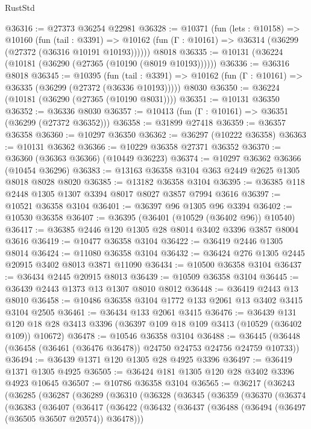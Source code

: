 \begin{lexlean}{RustStd}
\begin{coremodule}
@36316 := @27373 @36254 @22981
@36328 := @10371
    (fun (lets : @10158) =>
    @10160
      (fun (tail : @3391) =>
      @10162 (fun (Γ : @10161) => @36314 (@36299 (@27372 (@36316 @10191 @10193))))))
    @8018
@36335 := @10131 (@36224 (@10181 (@36290 (@27365 (@10190 (@8019 @10193))))))
@36336 := @36316 @8018
@36345 := @10395
    (fun (tail : @3391) => @10162 (fun (Γ : @10161) => @36335 (@36299 (@27372 (@36336 @10193)))))
    @8030
@36350 := @36224 (@10181 (@36290 (@27365 (@10190 @8031))))
@36351 := @10131 @36350
@36352 := @36336 @8030
@36357 := @10413 (fun (Γ : @10161) => @36351 (@36299 (@27372 @36352)))
@36358 := @31899 @27418
@36359 := @36357 @36358
@36360 := @10297 @36350
@36362 := @36297 (@10222 @36358)
@36363 := @10131 @36362
@36366 := @10229 @36358 @27371 @36352
@36370 := @36360 (@36363 @36366) (@10449 @36223)
@36374 := @10297 @36362 @36366 (@10454 @36296)
@36383 := @13163 @36358 @3104 @363 @2449 @2625 @1305 @8018 @8028 @8020
@36385 := @13182 @36358 @3104
@36395 := @36385 @118 @2448 @1305 @1307 @3394 @8017 @8027 @3857 @7994 @3616
@36397 := @10521 @36358 @3104
@36401 := @36397 @96 @1305 @96 @3394
@36402 := @10530 @36358
@36407 := @36395 (@36401 (@10529 (@36402 @96)) @10540)
@36417 := @36385 @2446 @120 @1305 @28 @8014 @3402 @3396 @3857 @8004 @3616
@36419 := @10477 @36358 @3104
@36422 := @36419 @2446 @1305 @8014
@36424 := @11080 @36358 @3104
@36432 := @36424 @276 @1305 @2445 @20915 @3402 @8013 @3871 @11090
@36434 := @10500 @36358 @3104
@36437 := @36434 @2445 @20915 @8013
@36439 := @10509 @36358 @3104
@36445 := @36439 @2443 @1373 @13 @1307 @8010 @8012
@36448 := @36419 @2443 @13 @8010
@36458 := @10486 @36358 @3104 @1772 @133 @2061 @13 @3402 @3415 @3104 @2505
@36461 := @36434 @133 @2061 @3415
@36476 := @36439
    @131
    @120
    @18
    @28
    @3413
    @3396
    (@36397 @109 @18 @109 @3413 (@10529 (@36402 @109)) @10672)
@36478 := @10546 @36358 @3104
@36488 := @36445 (@36448 (@36458 (@36461 (@36476 @36478)) @24750 @24753 @24756 @24759 @10733))
@36494 := @36439 @1371 @120 @1305 @28 @4925 @3396
@36497 := @36419 @1371 @1305 @4925
@36505 := @36424 @181 @1305 @120 @28 @3402 @3396 @4923 @10645
@36507 := @10786 @36358 @3104
@36565 := @36217
    (@36243
      (@36285
        (@36287
          (@36289
            (@36310
              (@36328
                (@36345
                  (@36359
                    (@36370
                      (@36374
                        (@36383
                          (@36407
                            (@36417
                              (@36422
                                (@36432
                                  (@36437 (@36488 (@36494 (@36497 (@36505 @36507 @20574)) @36478)))

\end{coremodule}
\end{lexlean}
